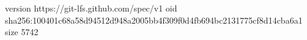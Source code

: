 version https://git-lfs.github.com/spec/v1
oid sha256:100401c68a58d94512d948a2005bb4f309f0d4fb694bc2131775cf8d14cba6a1
size 5742

